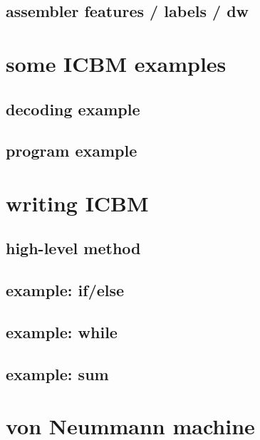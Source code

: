

\subsection{assembler features / labels / dw}



\section{some ICBM examples}

\subsection{decoding example}


\subsection{program example}


\section{writing ICBM}

\subsection{high-level method}




\subsection{example: if/else}



\subsection{example: while}



\subsection{example: sum}



\section{von Neummann machine}

